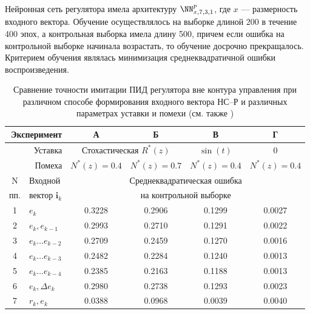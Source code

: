 Нейронная сеть регулятора имела архитектуру $\NN^p_{x,7,3,1}$,
где $x$ --- размерность входного вектора.  Обучение осуществлялось на
выборке длиной 200 в течение 400 эпох, а контрольная выборка имела
длину 500, причем если ошибка на контрольной выборке начинала
возрастать, то обучение досрочно прекращалось.  Критерием обучения
являлась минимизация среднеквадратичной ошибки воспроизведения.

\begin{table}[ht]
\centering
\caption{Сравнение точности имитации ПИД регулятора вне контура управления
         при различном способе формирования входного вектора НС--Р и
         различных параметрах уставки и помехи (см. также
         )}
\label{tabl:nnc_pretr_input_vec}
\begin{tabular}{|c|l|c|c|c|c|}
\hline
\multicolumn{2}{|r|}{Эксперимент} & {\sf А} & {\sf Б} & {\sf В} & {\sf Г}\\
\hline
\multicolumn{2}{|r|}{Уставка} &
  \multicolumn{2}{|c|}{Стохастическая $R^*(z)$} & $\sin(t)$ & $0$ \\
\hline
\multicolumn{2}{|r|}{Помеха} & $N^*(z)=0.4$ & $N^*(z)=0.7$ & $N^*(z)=0.4$ & $N^*(z)=0.4$\\
\hline\hline
N   & Входной               & \multicolumn{4}{|c|}{Среднеквадратическая ошибка} \\
пп. & вектор $\mathbf{i}_k$ & \multicolumn{4}{|c|}{на контрольной выборке}\\
\hline
1 & $e_k$                 & 0.3228 & 0.2906 & 0.1299 & 0.0027\\
2 & $e_k,e_{k-1}$         & 0.2993 & 0.2710 & 0.1291 & 0.0022\\
3 & $e_k\ldots e_{k-2}$   & 0.2709 & 0.2459 & 0.1270 & 0.0016\\
4 & $e_k\ldots e_{k-3}$   & 0.2482 & 0.2284 & 0.1240 & 0.0013\\
5 & $e_k\ldots e_{k-4}$   & 0.2385 & 0.2163 & 0.1188 & 0.0013\\
6 & $e_k,\Delta e_k$      & 0.2980 & 0.2738 & 0.1293 & 0.0023\\
7 & $r_k,e_k$             & 0.0388 & 0.0968 & 0.0039 & 0.0040\\
\hline
\end{tabular}
\end{table}

